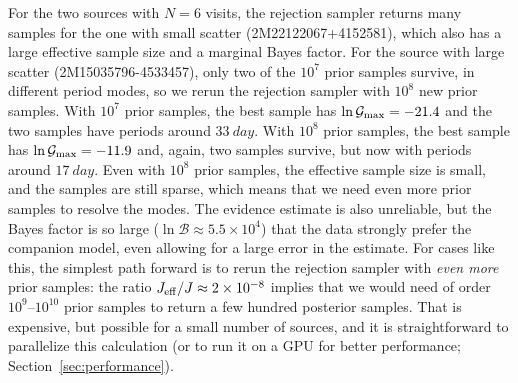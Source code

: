 \documentclass[twocolumn]{AASTeX7/aastex701}
\newcommand{\harv}{\package{harv}}
\begin{document}
For the two sources with $N=6$ visits, the rejection sampler returns many samples for
the one with small scatter (2M22122067+4152581), which also has a large effective sample
size and a marginal Bayes factor.
For the source with large scatter (2M15035796-4533457), only two of the $10^7$ prior
samples survive, in different period modes, so we rerun the rejection sampler with
$10^8$ new prior samples.
With $10^7$ prior samples, the best sample has $\ln \mathcal{G}_{\rm max} = -21.4$ and
the two samples have periods around $33~\unit{day}$.
With $10^8$ prior samples, the best sample has $\ln \mathcal{G}_{\rm max} = -11.9$ and,
again, two samples survive, but now with periods around $17~\unit{day}$.
Even with $10^8$ prior samples, the effective sample size is small, and the samples are
still sparse, which means that we need even more prior samples to resolve the modes.
The evidence estimate is also unreliable, but the Bayes factor is so large
($\ln\mathcal{B} \approx 5.5\times10^4$) that the data strongly prefer the companion
model, even allowing for a large error in the estimate.
For cases like this, the simplest path forward is to rerun the rejection sampler with
\textit{even more} prior samples: the ratio $J_{\rm eff}/J \approx 2\times10^{-8}$
implies that we would need of order $10^9$--$10^{10}$ prior samples to return a few
hundred posterior samples.
That is expensive, but possible for a small number of sources, and it is straightforward
to parallelize this calculation (or to run it on a GPU for better performance;
Section~\ref{sec:performance}).
\end{document}
